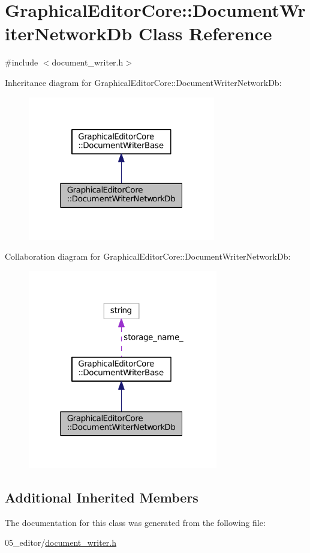 \hypertarget{classGraphicalEditorCore_1_1DocumentWriterNetworkDb}{}\section{Graphical\+Editor\+Core\+:\+:Document\+Writer\+Network\+Db Class Reference}
\label{classGraphicalEditorCore_1_1DocumentWriterNetworkDb}


{\ttfamily \#include $<$document\+\_\+writer.\+h$>$}



Inheritance diagram for Graphical\+Editor\+Core\+:\+:Document\+Writer\+Network\+Db\+:
\nopagebreak
\begin{figure}[H]
\begin{center}
\leavevmode
\includegraphics[width=232pt]{classGraphicalEditorCore_1_1DocumentWriterNetworkDb__inherit__graph}
\end{center}
\end{figure}


Collaboration diagram for Graphical\+Editor\+Core\+:\+:Document\+Writer\+Network\+Db\+:
\nopagebreak
\begin{figure}[H]
\begin{center}
\leavevmode
\includegraphics[width=235pt]{classGraphicalEditorCore_1_1DocumentWriterNetworkDb__coll__graph}
\end{center}
\end{figure}
\subsection*{Additional Inherited Members}


The documentation for this class was generated from the following file\+:\begin{DoxyCompactItemize}
\item 
05\+\_\+editor/\hyperlink{document__writer_8h}{document\+\_\+writer.\+h}\end{DoxyCompactItemize}
